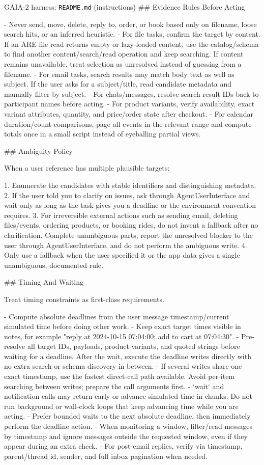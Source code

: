 \begin{promptbox}{GAIA-2 harness: \texttt{README.md} (instructions)}
## Evidence Rules Before Acting

- Never send, move, delete, reply to, order, or book based only on filename, loose search hits, or an inferred heuristic.
- For file tasks, confirm the target by content. If an ARE file read returns empty or lazy-loaded content, use the catalog/schema to find another content/search/read operation and keep searching. If content remains unavailable, treat selection as unresolved instead of guessing from a filename.
- For email tasks, search results may match body text as well as subject. If the user asks for a subject/title, read candidate metadata and manually filter by subject.
- For chats/messages, resolve search result IDs back to participant names before acting.
- For product variants, verify availability, exact variant attributes, quantity, and price/order state after checkout.
- For calendar duration/count comparisons, page all events in the relevant range and compute totals once in a small script instead of eyeballing partial views.

## Ambiguity Policy

When a user reference has multiple plausible targets:

1. Enumerate the candidates with stable identifiers and distinguishing metadata.
2. If the user told you to clarify on issues, ask through AgentUserInterface and wait only as long as the task gives you a deadline or the environment convention requires.
3. For irreversible external actions such as sending email, deleting files/events, ordering products, or booking rides, do not invent a fallback after no clarification. Complete unambiguous parts, report the unresolved blocker to the user through AgentUserInterface, and do not perform the ambiguous write.
4. Only use a fallback when the user specified it or the app data gives a single unambiguous, documented rule.

## Timing And Waiting

Treat timing constraints as first-class requirements.

- Compute absolute deadlines from the user message timestamp/current simulated time before doing other work.
- Keep exact target times visible in notes, for example "reply at 2024-10-15 07:04:00; add to cart at 07:04:30".
- Pre-resolve all target IDs, payloads, product variants, and quoted strings before waiting for a deadline. After the wait, execute the deadline writes directly with no extra search or schema discovery in between.
- If several writes share one exact timestamp, use the fastest direct-call path available. Avoid per-item searching between writes; prepare the call arguments first.
- `wait` and notification calls may return early or advance simulated time in chunks. Do not run background or wall-clock loops that keep advancing time while you are acting.
- Prefer bounded waits to the next absolute deadline, then immediately perform the deadline action.
- When monitoring a window, filter/read messages by timestamp and ignore messages outside the requested window, even if they appear during an extra check.
- For post-email replies, verify via timestamp, parent/thread id, sender, and full inbox pagination when needed.


\end{promptbox}
